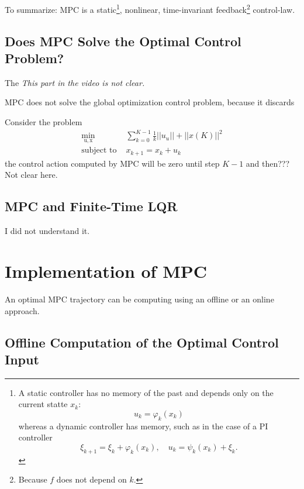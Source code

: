 \documentclass[11pt]{report}
\newcommand{\bs}[1]{\boldsymbol{#1}}
\newcommand{\bsu}{\bs{\mathrm{u}}}
\newcommand{\bsx}{\bs{\mathrm{x}}}
\begin{document}

To summarize: MPC is a static\footnote{A static controller has no memory of the past and depends only on the current statte $x_k$:
  \begin{equation*}
    u_k = \varphi_k(x_k)
  \end{equation*}
  whereas a dynamic controller has memory, such as in the case of a
  PI controller
  \begin{equation*}
    \xi_{k+1} = \xi_k + \varphi_k(x_k),\quad u_k = \psi_k(x_k) + \xi_k.
  \end{equation*}}, nonlinear, time-invariant feedback\footnote{Because $f$ does not depend on $k$.} control-law.


\subsection{Does MPC Solve the Optimal Control Problem?}
\label{sec:MPC-not-an-optimal-control-solver}

The 
\emph{This part in the video is not clear.}

MPC does not solve the global optimization control problem, because it
discards

Consider the problem
\begin{align*}
  \min_{\bsu,\bsx} & \sum_{k=0}^{K-1}\frac {1}{k}||u_u|| + ||x(K)||^2\\
  \text{subject to } &x_{k+1} = x_k+u_k
\end{align*}
the control action computed by MPC will be zero until step $K-1$ and
then??? Not clear here.

\subsection{MPC and Finite-Time LQR}
\label{sec:MPC-finite-time-LQR}

I did not understand it.

\section{Implementation of MPC}
\label{sec:implementation-MPC}

An optimal MPC trajectory can be computing using an offline or an online approach.

\subsection{Offline Computation of the Optimal Control Input}
\label{sec:offline-computation-MPC}
\end{document}
